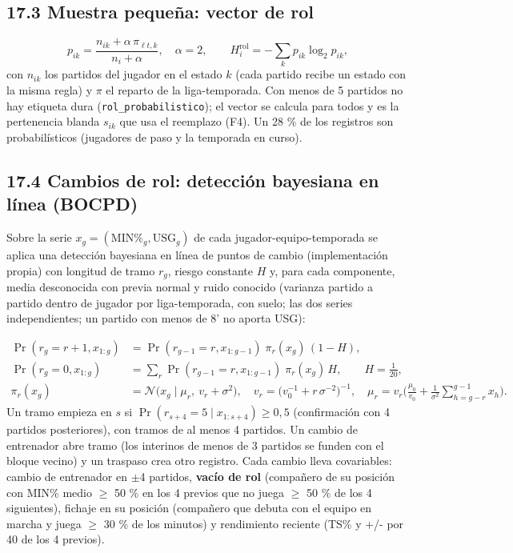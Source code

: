 \documentclass[10pt,a4paper]{article}
\begin{document}
\subsection*{17.3 Muestra pequeña: vector de rol}
\[
p_{ik} = \frac{n_{ik} + \alpha\,\pi_{\ell t,k}}{n_i + \alpha}, \quad \alpha = 2, \qquad H^{\mathrm{rol}}_i = -\sum_k p_{ik}\log_2 p_{ik} ,
\]
con $n_{ik}$ los partidos del jugador en el estado $k$ (cada partido recibe un estado con la misma regla) y $\pi$ el reparto de la liga-temporada. Con menos de 5 partidos no hay etiqueta dura (\texttt{rol\_probabilistico}); el vector se calcula para todos y es la pertenencia blanda $s_{ik}$ que usa el reemplazo (F4). Un 28 \% de los registros son probabilísticos (jugadores de paso y la temporada en curso).

\subsection*{17.4 Cambios de rol: detección bayesiana en línea (BOCPD)}
Sobre la serie $x_g = (\mathrm{MIN\%}_g, \mathrm{USG}_g)$ de cada jugador-equipo-temporada se aplica una detección bayesiana en línea de puntos de cambio (implementación propia) con longitud de tramo $r_g$, riesgo constante $H$ y, para cada componente, media desconocida con previa normal y ruido conocido (varianza partido a partido dentro de jugador por liga-temporada, con suelo; las dos series independientes; un partido con menos de 8' no aporta USG):

\[
\begin{aligned} \Pr(r_g = r+1, x_{1:g}) &= \Pr(r_{g-1} = r, x_{1:g-1})\; \pi_r(x_g)\,(1-H),\\ \Pr(r_g = 0, x_{1:g}) &= \textstyle\sum_r \Pr(r_{g-1}=r, x_{1:g-1})\; \pi_r(x_g)\,H, \qquad H = \tfrac{1}{20},\\ \pi_r(x_g) &= \mathcal N\!\big(x_g \mid \mu_r,\ v_r + \sigma^2\big), \quad v_r = \big(v_0^{-1} + r\,\sigma^{-2}\big)^{-1}, \quad \mu_r = v_r\Big(\frac{\mu_0}{v_0} + \frac{1}{\sigma^2}\textstyle\sum_{h=g-r}^{g-1} x_h\Big). \end{aligned}
\]
Un tramo empieza en $s$ si $\Pr(r_{s+4} = 5 \mid x_{1:s+4}) \ge 0{,}5$ (confirmación con 4 partidos posteriores), con tramos de al menos 4 partidos. Un cambio de entrenador abre tramo (los interinos de menos de 3 partidos se funden con el bloque vecino) y un traspaso crea otro registro. Cada cambio lleva covariables: cambio de entrenador en \ensuremath{\pm}4 partidos, \textbf{vacío de rol} (compañero de su posición con MIN\% medio \ensuremath{\geq} 50 \% en los 4 previos que no juega \ensuremath{\geq} 50 \% de los 4 siguientes), fichaje en su posición (compañero que debuta con el equipo en marcha y juega \ensuremath{\geq} 30 \% de los minutos) y rendimiento reciente (TS\% y +/- por 40 de los 4 previos).
\end{document}
